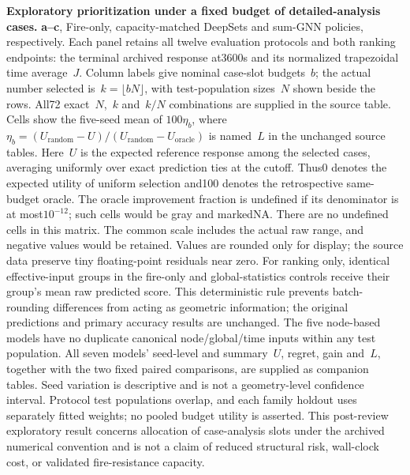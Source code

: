 \textbf{Exploratory prioritization under a fixed budget of detailed-analysis cases.}
\textbf{a--c}, Fire-only, capacity-matched DeepSets and sum-GNN policies, respectively. Each panel retains all twelve evaluation protocols and both ranking endpoints: the terminal archived response at3600s and its normalized trapezoidal time average~$J$. Column labels give nominal case-slot budgets~$b$; the actual number selected is~$k=\lfloor bN\rfloor$, with test-population sizes~$N$ shown beside the rows. All72 exact~$N$,~$k$ and~$k/N$ combinations are supplied in the source table.
Cells show the five-seed mean of $100\eta_b$, where $\eta_b=(U_{\mathrm{random}}-U)/(U_{\mathrm{random}}-U_{\mathrm{oracle}})$ is named~$L$ in the unchanged source tables. Here~$U$ is the expected reference response among the selected cases, averaging uniformly over exact prediction ties at the cutoff. Thus0 denotes the expected utility of uniform selection and100 denotes the retrospective same-budget oracle. The oracle improvement fraction is undefined if its denominator is at most$10^{-12}$; such cells would be gray and markedNA. There are no undefined cells in this matrix. The common scale includes the actual raw range, and negative values would be retained. Values are rounded only for display; the source data preserve tiny floating-point residuals near zero.
For ranking only, identical effective-input groups in the fire-only and global-statistics controls receive their group's mean raw predicted score. This deterministic rule prevents batch-rounding differences from acting as geometric information; the original predictions and primary accuracy results are unchanged. The five node-based models have no duplicate canonical node/global/time inputs within any test population. All seven models' seed-level and summary~$U$, regret, gain and~$L$, together with the two fixed paired comparisons, are supplied as companion tables. Seed variation is descriptive and is not a geometry-level confidence interval. Protocol test populations overlap, and each family holdout uses separately fitted weights; no pooled budget utility is asserted. This post-review exploratory result concerns allocation of case-analysis slots under the archived numerical convention and is not a claim of reduced structural risk, wall-clock cost, or validated fire-resistance capacity.
